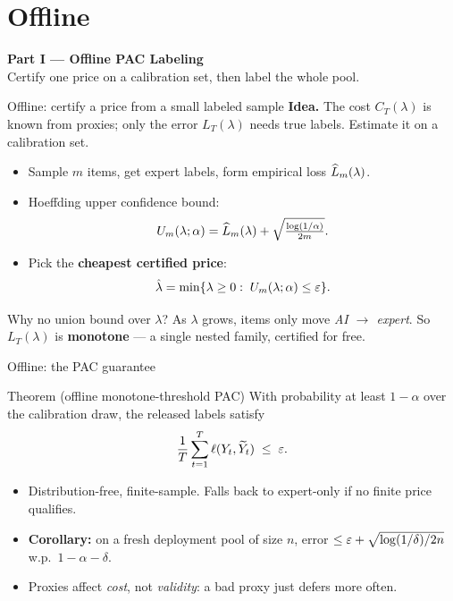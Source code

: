 \section{Offline}
\begin{frame}[plain]
  \centering
  \vfill
  {\Large\bfseries\color{accent} Part I --- Offline PAC Labeling}\\[6pt]
  \normalsize Certify one price on a calibration set, then label the whole pool.
  \vfill
\end{frame}

\begin{frame}{Offline: certify a price from a small labeled sample}
  \textbf{Idea.} The cost $C_T(\lambda)$ is known from proxies; only the error
  $L_T(\lambda)$ needs true labels. Estimate it on a calibration set.
  \begin{itemize}
    \item Sample $m$ items, get expert labels, form empirical loss
          $\widehat L_m(\lambda)$.
    \item Hoeffding upper confidence bound:
          \[
             U_m(\lambda;\alpha)=\widehat L_m(\lambda)+\sqrt{\tfrac{\log(1/\alpha)}{2m}}.
          \]
    \item Pick the \textbf{cheapest certified price}:
          \[
             \hat\lambda=\min\{\lambda\ge0:\;U_m(\lambda;\alpha)\le\varepsilon\}.
          \]
  \end{itemize}
  \begin{block}{Why no union bound over $\lambda$?}
    As $\lambda$ grows, items only move \emph{AI $\to$ expert}. So
    $L_T(\lambda)$ is \textbf{monotone} --- a single nested family, certified for free.
  \end{block}
\end{frame}

\begin{frame}{Offline: the PAC guarantee}
  \begin{block}{Theorem (offline monotone-threshold PAC)}
    With probability at least $1-\alpha$ over the calibration draw, the released
    labels satisfy
    \[
       \frac1T\sum_{t=1}^{T}\ell(Y_t,\widetilde Y_t)\;\le\;\varepsilon.
    \]
  \end{block}
  \begin{itemize}
    \item Distribution-free, finite-sample. Falls back to expert-only if no
          finite price qualifies.
    \item \textbf{Corollary:} on a fresh deployment pool of size $n$, error
          $\le \varepsilon+\sqrt{\log(1/\delta)/2n}$ w.p.\ $1-\alpha-\delta$.
    \item Proxies affect \emph{cost}, not \emph{validity}: a bad proxy just
          defers more often.
  \end{itemize}
\end{frame}

